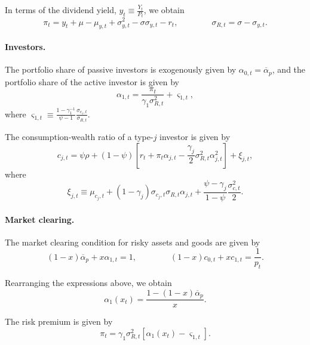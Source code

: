 \documentclass[11pt,english]{article}
\begin{document}
In terms of the dividend yield, $y_t \equiv \frac{Y_t}{P_t}$, we obtain
\begin{equation}
    \pi_t = y_t + \mu-\mu_{y,t} + \sigma_{y,t}^2 - \sigma \sigma_{y,t}  - r_t, \qquad \qquad
    \sigma_{R,t} = \sigma -\sigma_{y,t}.
\end{equation}

\paragraph{Investors.} The portfolio share of passive investors is exogenously given by $\alpha_{0,t} = \overline{\alpha}_{p}$, and the portfolio share of the active investor is given by
\begin{equation}
    \alpha_{1,t} = \frac{\pi_t}{\gamma_1 \sigma_{R,t}^2} + \varsigma_{1,t},
\end{equation}
where $\varsigma_{1,t} \equiv \frac{1-\gamma_1^{-1}}{\psi-1} \frac{\sigma_{c_1,t}}{\sigma_{R,t}}$.

The consumption-wealth ratio of a type-$j$ investor is given by
\begin{equation}
    c_{j,t} = \psi \rho + (1-\psi) \left[ r_t + \pi_t \alpha_{j,t} - \frac{\gamma_j}{2} \sigma_{R,t}^2 \alpha_{j,t}^2 \right] + \xi_{j,t},
\end{equation}
where
\begin{equation}
    \xi_{j,t} \equiv \mu_{c_j,t} + (1-\gamma_j) \sigma_{c_j,t} \sigma_{R,t} \alpha_{j,t} + \frac{\psi-\gamma_j}{1-\psi} \frac{\sigma_{c,t}^2}{2}.
\end{equation}

\paragraph{Market clearing.} The market clearing condition for risky assets and goods are given by
\begin{equation}
    (1-x) \overline{\alpha}_p +x \alpha_{1,t} = 1, \qquad \qquad 
    (1-x) c_{0,t}+ x c_{1,t} = \frac{1}{p_t}.
\end{equation}

Rearranging the expressions above, we obtain
\begin{equation}
    \alpha_{1}(x_t) = \frac{1 - (1-x) \overline{\alpha}_p}{x}.
\end{equation}

The risk premium is given by
\begin{equation}
    \pi_t = \gamma_1 \sigma_{R,t}^2 \left[ \alpha_{1}(x_t) - \varsigma_{1,t} \right].
\end{equation}
\end{document}
